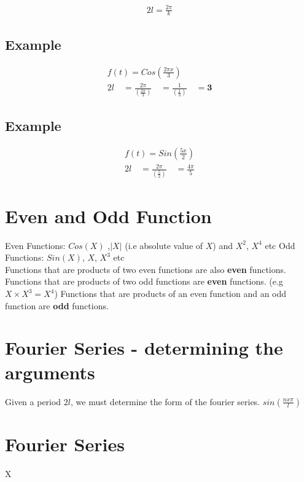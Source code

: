 \documentclass[12pt, a4paper]{article}
\begin{document}
\begin{eqnarray}
2l = \frac{2 \pi}{k}\nonumber
\end{eqnarray}


\subsection{Example}
\begin{eqnarray}f(t) = Cos(\frac{2 \pi x}{3}) \nonumber\\
2l \quad=\frac{2\pi}{(\frac{2\pi}{3})}\quad =
\frac{1}{(\frac{1}{3})}\quad= \textbf{3}\nonumber
\end{eqnarray}

\subsection{Example}
\begin{eqnarray}f(t) = Sin(\frac{5x}{2}) \nonumber\\
2l \quad=\frac{2\pi}{(\frac{5}{2})}\quad = \frac{4\pi}{5}\nonumber
\end{eqnarray}

\section{Even and Odd Function}
Even Functions: $Cos(X)$ ,$|X|$ (i.e absolute value of $X$) and
$X^2$, $X^4$ etc
\newline
Odd Functions: $Sin(X)$, $X$, $X^3$ etc
\\
Functions that are products of two even functions are also
\textbf{even} functions.
\newline
Functions that are products of two odd functions are
\textbf{even} functions. (e.g $X \times X^3 = X^4$)
\newline
Functions that are products of an even function and an
odd function are \textbf{odd} functions.
\section{Fourier Series - determining the arguments}
Given a period $2l$, we must determine the form of the fourier
series. $sin( \frac{n x \pi}{l})$
\section{Fourier Series}
X
\end{document}
